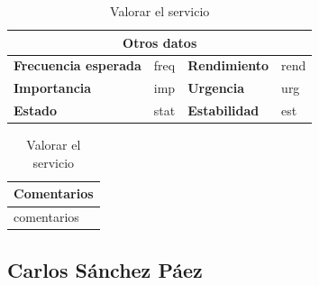 \documentclass[12pt,spanish]{article}
\begin{document}
\begin{table}[H]
\vspace{1cm}

\begin{tabular}{|m{3.72cm}|m{3.72cm}|m{3.72cm}|m{3.72cm}|}
\hline
\multicolumn{4}{|c|}{\textbf{Otros datos}} \\
\hline
\textbf{Frecuencia esperada} & freq & \textbf{Rendimiento} & rend \\
\hline
\textbf{Importancia} & imp & \textbf{Urgencia} & urg \\
\hline
\textbf{Estado} & stat & \textbf{Estabilidad} & est \\
\hline
\end{tabular}

\vspace{1cm}

\begin{tabular}{|m{16.2cm}|}
\hline
\textbf{Comentarios} \\
\hline
comentarios \\
\hline
\end{tabular}

\caption{Valorar el servicio}

\end{table}


\subsection{Carlos Sánchez Páez}
\end{document}
